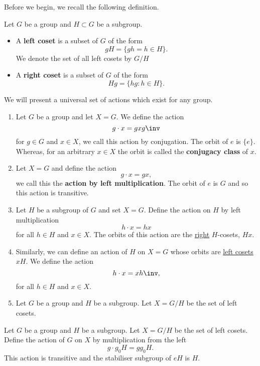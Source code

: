 \documentclass[12pt, a4paper]{article}
\begin{document}
Before we begin, we recall the following definition.

\begin{definition}
    Let \(G\) be a group and \(H \subset G\) be a subgroup.
    \begin{itemize}
        \item A \textbf{left coset} is a subset of \(G\) of the form 
        \[gH = \{gh = h \in H\}.\]
        We denote the set of all left cosets by \(G/H\)
        \item A \textbf{right coset} is a subset of \(G\) of the form 
        \[Hg = \{hg : h \in H\}.\]
    \end{itemize}
\end{definition}

\begin{mdexample}
    We will present a universal set of actions which exist for any group.
    \begin{enumerate}
        \item Let \(G\) be a group and let \(X =G\). We define the action 
        \[g \cdot x = gxg\inv\]
        for \(g \in G\) and \(x \in X\), we call this action by conjugation. The orbit of \(e\) is \(\{e\}\). Whereas, for an arbitrary \(x \in X\) the orbit is called the \textbf{conjugacy class} of \(x\).
        \item Let \(X=G\) and define the action 
        \[g \cdot x =gx,\]
        we call this the \textbf{action by left multiplication}. The orbit of \(e\) is \(G\) and so this action is transitive.
        \item Let \(H\) be a subgroup of \(G\) and set \(X=G\). Define the action on \(H\) by left multiplication
        \[h\cdot x=hx\]
        for all \(h \in H\) and \(x\in X\). The orbits of this action are the \ul{right} \(H\)-cosets,  \(Hx\).
        \item Similarly, we can define an action of \(H\) on \(X=G\) whose orbits are \ul{left cosets} \(xH\). We define the action 
        \[h\cdot x = xh\inv,\]
        for all \(h \in H\) and \(x\in X\).
        \item Let \(G\) be a group and \(H\) be a subgroup. Let \(X = G/H\) be the set of left cosets. 
    \end{enumerate}
\end{mdexample}

\begin{mdthm}
    Let \(G\) be a group and \(H\) be a subgroup. Let \(X = G/H\) be the set of left cosets. Define the action of \(G\) on \(X\) by multiplication from the left 
    \[g \cdot g_0H =gg_0 H.\]
    This action is transitive and the stabiliser subgroup of \(eH\) is \(H\).
\end{mdthm}
\end{document}
